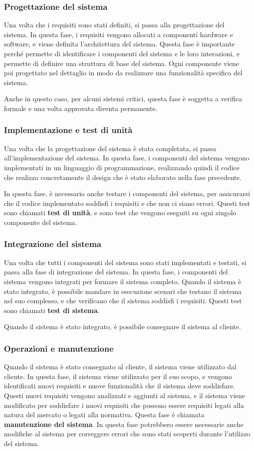 \subsubsection{Progettazione del sistema}
Una volta che i requisiti sono stati definiti, si passa alla progettazione del sistema.
In questa fase, i requisiti vengono allocati a componenti hardware e software, e viene
definita l'architettura del sistema. Questa fase è importante perché permette di
identificare i componenti del sistema e le loro interazioni, e permette di definire
una struttura di base del sistema. Ogni componente viene poi progettato 
nel dettaglio in modo da realizzare una funzionalità specifica del sistema. 

Anche in questo caso, per alcuni sistemi critici, questa fase è soggetta a verifica formale e 
una volta approvata diventa permanente.
\subsubsection{Implementazione e test di unità}
Una volta che la progettazione del sistema è stata completata, si passa all'implementazione
del sistema. In questa fase, i componenti del sistema vengono implementati in un linguaggio
di programmazione, realizzando quindi il codice che realizza concretamente il design 
che è stato elaborato nella fase precedente.

In questa fase, è necessario anche testare i componenti del sistema, per assicurarsi che
il codice implementato soddisfi i requisiti e che non ci siano errori. Questi test
sono chiamati \textbf{test di unità}, e sono test che vengono eseguiti su ogni singolo
componente del sistema. 
\subsubsection{Integrazione del sistema}
Una volta che tutti i componenti del sistema sono stati implementati e testati, si passa
alla fase di integrazione del sistema. In questa fase, i componenti del sistema vengono
integrati per formare il sistema completo. Quando il sistema è stato integrato, è 
possibile mandare in esecuzione scenari che testano il sistema nel suo complesso, e che
verificano che il sistema soddisfi i requisiti. Questi test sono chiamati \textbf{test di
sistema}.

Quando il sistema è stato integrato, è possibile consegnare il sistema al cliente.
\subsubsection{Operazioni e manutenzione}
Quando il sistema è stato consegnato al cliente, il sistema viene utilizzato dal cliente.
In questa fase, il sistema viene utilizzato per il suo scopo, e vengono identificati
nuovi requisiti e nuove funzionalità che il sistema deve soddisfare. Questi nuovi requisiti
vengono analizzati e aggiunti al sistema, e il sistema viene modificato per soddisfare
i nuovi requisiti che possono essere requisiti legati alla natura del mercato o 
legati alla normativa. Questa fase è chiamata \textbf{manutenzione del sistema}.
In questa fase potrebbero essere necessarie anche modifiche al sistema per correggere
errori che sono stati scoperti durante l'utilizzo del sistema.
